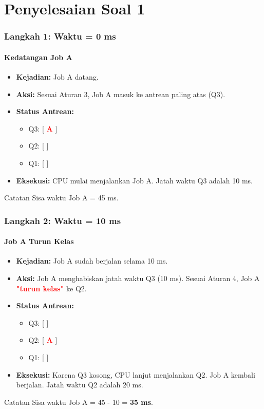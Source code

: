 \documentclass[t,aspectratio=169,xcolor=dvipsnames]{beamer}
\newcommand{\tem}[1]{\textbf{\textcolor{red}{#1}}}
\begin{document}
\section{Penyelesaian Soal 1}

\begin{frame}
    \frametitle{Langkah 1: Waktu = 0 ms}
    \framesubtitle{Kedatangan Job A}
    \small
    \begin{itemize}
        \item \textbf{Kejadian:} Job A datang.
        \item \textbf{Aksi:} Sesuai Aturan 3, Job A masuk ke antrean paling atas (Q3).
        \item \textbf{Status Antrean:}
        \begin{itemize}
            \item Q3: [ \tem{A} ]
            \item Q2: [ ]
            \item Q1: [ ]
        \end{itemize}
        \item \textbf{Eksekusi:} CPU mulai menjalankan Job A. Jatah waktu Q3 adalah 10 ms.
    \end{itemize}
    \vspace{0.3cm}
    \begin{exampleblock}{Catatan}
        Sisa waktu Job A = 45 ms.
    \end{exampleblock}
\end{frame}

\begin{frame}
    \frametitle{Langkah 2: Waktu = 10 ms}
    \framesubtitle{Job A Turun Kelas}
    \small
    \begin{itemize}
        \item \textbf{Kejadian:} Job A sudah berjalan selama 10 ms.
        \item \textbf{Aksi:} Job A menghabiskan jatah waktu Q3 (10 ms). Sesuai Aturan 4, Job A \tem{"turun kelas"} ke Q2.
        \item \textbf{Status Antrean:}
        \begin{itemize}
            \item Q3: [ ]
            \item Q2: [ \tem{A} ]
            \item Q1: [ ]
        \end{itemize}
        \item \textbf{Eksekusi:} Karena Q3 kosong, CPU lanjut menjalankan Q2. Job A kembali berjalan. Jatah waktu Q2 adalah 20 ms.
    \end{itemize}
    \vspace{0.3cm}
    \begin{exampleblock}{Catatan}
        Sisa waktu Job A = 45 - 10 = \textbf{35 ms}.
    \end{exampleblock}
\end{frame}
\end{document}
